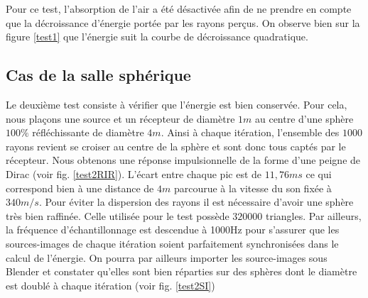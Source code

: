 Pour ce test, l'absorption de l'air a été désactivée afin de ne prendre en compte que la décroissance d'énergie portée par les rayons perçus. On observe bien sur la figure \ref{test1} que l'énergie suit la courbe de décroissance quadratique.
 		
		
\subsection{Cas de la salle sphérique}

Le deuxième test consiste à vérifier que l'énergie est bien conservée. Pour cela, nous plaçons une source et un récepteur de diamètre $1m$ au centre d'une sphère $100\%$ réfléchissante de diamètre $4m$. Ainsi à chaque itération, l'ensemble des $1000$ rayons revient se croiser au centre de la sphère et sont donc tous captés par le récepteur. Nous obtenons une réponse impulsionnelle de la forme d'une peigne de Dirac (voir fig. \ref{test2RIR}). L'écart entre chaque pic est de $11,76 ms$ ce qui correspond bien à une distance de $4m$ parcourue à la vitesse du son fixée à $340m/s$. Pour éviter la dispersion des rayons il est nécessaire d'avoir une sphère très bien raffinée. Celle utilisée pour le test possède $320000$ triangles. Par ailleurs, la fréquence d'échantillonnage est descendue à 1000Hz pour s'assurer que les sources-images de chaque itération soient parfaitement synchronisées dans le calcul de l'énergie. On pourra par ailleurs importer les source-images sous Blender et constater qu'elles sont bien réparties sur des sphères dont le diamètre est doublé à chaque itération (voir fig. \ref{test2SI})

